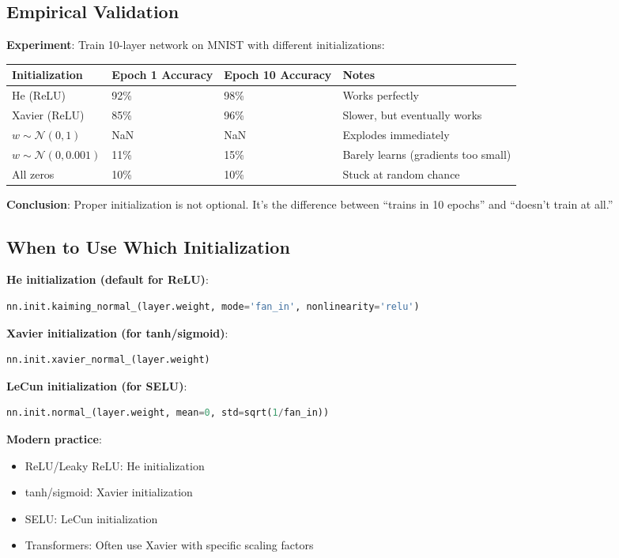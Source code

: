 \documentclass[11pt,oneside]{book}
\begin{document}
\subsection{Empirical Validation}

\textbf{Experiment}: Train 10-layer network on MNIST with different initializations:

\begin{table}[h]
\centering
\begin{tabular}{llll}
\toprule
\textbf{Initialization} & \textbf{Epoch 1 Accuracy} & \textbf{Epoch 10 Accuracy} & \textbf{Notes} \\
\midrule
He (ReLU) & 92\% & 98\% & Works perfectly \\
Xavier (ReLU) & 85\% & 96\% & Slower, but eventually works \\
$w \sim \mathcal{N}(0, 1)$ & NaN & NaN & Explodes immediately \\
$w \sim \mathcal{N}(0, 0.001)$ & 11\% & 15\% & Barely learns (gradients too small) \\
All zeros & 10\% & 10\% & Stuck at random chance \\
\bottomrule
\end{tabular}
\end{table}

\textbf{Conclusion}: Proper initialization is not optional. It's the difference between ``trains in 10 epochs'' and ``doesn't train at all.''

\subsection{When to Use Which Initialization}

\textbf{He initialization (default for ReLU)}:
\begin{lstlisting}[language=Python]
nn.init.kaiming_normal_(layer.weight, mode='fan_in', nonlinearity='relu')
\end{lstlisting}

\textbf{Xavier initialization (for tanh/sigmoid)}:
\begin{lstlisting}[language=Python]
nn.init.xavier_normal_(layer.weight)
\end{lstlisting}

\textbf{LeCun initialization (for SELU)}:
\begin{lstlisting}[language=Python]
nn.init.normal_(layer.weight, mean=0, std=sqrt(1/fan_in))
\end{lstlisting}

\textbf{Modern practice}:
\begin{itemize}
\item ReLU/Leaky ReLU: He initialization
\item tanh/sigmoid: Xavier initialization
\item SELU: LeCun initialization
\item Transformers: Often use Xavier with specific scaling factors
\end{itemize}
\end{document}
